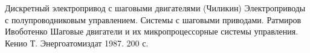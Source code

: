 \begin{thebibliography}{20}
 Дискретный электропривод с шаговыми двигателями (Чиликин)
 Электроприводы с полупроводниковым управлением. Системы с шаговыми
приводами. Ратмиров Ивоботенко
 Шаговые двигатели и их микропроцессорные системы управления. Кенио Т.
Энергоатомиздат 1987. 200 с.
\end{thebibliography}
